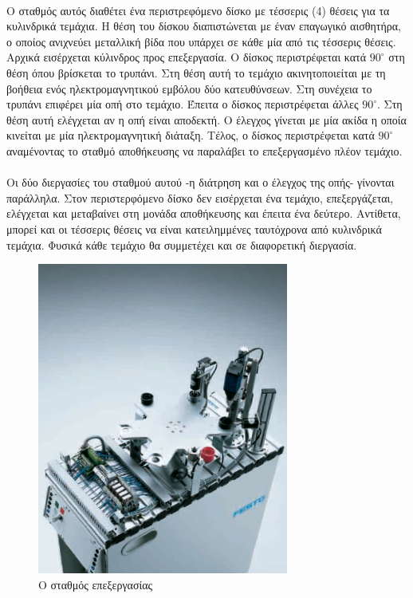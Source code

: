 \documentclass[a4paper,12pt,twoside]{report}
\begin{document}
{				\paragraph{} {Ο σταθμός αυτός διαθέτει ένα περιστρεφόμενο δίσκο με τέσσερις (4) θέσεις για τα κυλινδρικά τεμάχια. Η θέση του δίσκου διαπιστώνεται με έναν επαγωγικό αισθητήρα, ο οποίος ανιχνεύει μεταλλική βίδα που υπάρχει σε κάθε μία από τις τέσσερις θέσεις. Αρχικά εισέρχεται κύλινδρος προς επεξεργασία. Ο δίσκος περιστρέφεται κατά $90^{\circ}$ στη θέση όπου βρίσκεται το τρυπάνι. Στη θέση αυτή το τεμάχιο ακινητοποιείται με τη βοήθεια ενός ηλεκτρομαγνητικού εμβόλου δύο κατευθύνσεων. Στη συνέχεια το τρυπάνι επιφέρει μία οπή στο τεμάχιο. Έπειτα ο δίσκος περιστρέφεται άλλες $90^{\circ}$. Στη θέση αυτή ελέγχεται αν η οπή είναι αποδεκτή. Ο έλεγχος γίνεται με μία ακίδα η οποία κινείται με μία ηλεκτρομαγνητική διάταξη. Τέλος, ο δίσκος περιστρέφεται κατά $90^{\circ}$ αναμένοντας το σταθμό αποθήκευσης να παραλάβει το επεξεργασμένο πλέον τεμάχιο.
				}
				\paragraph{} {Οι δύο διεργασίες του σταθμού αυτού -η διάτρηση και ο έλεγχος της οπής- γίνονται παράλληλα. Στον περιστερφόμενο δίσκο δεν εισέρχεται ένα τεμάχιο, επεξεργάζεται, ελέγχεται και μεταβαίνει στη μονάδα αποθήκευσης και έπειτα ένα δεύτερο. Αντίθετα, μπορεί και οι τέσσερις θέσεις να είναι κατειλημμένες ταυτόχρονα από κυλινδρικά τεμάχια. Φυσικά κάθε τεμάχιο θα συμμετέχει και σε διαφορετική διεργασία.
				}
				\begin{figure}[hp]
					\centering
					\includegraphics[scale=0.25]{ProcessingStationFesto.png}
					\caption{Ο σταθμός επεξεργασίας \cite{OverviewMPSStations}}
					\label{φωτ:Ο σταθμός επεξεργασίας από Festo}
				\end{figure}
								
}
\end{document}
